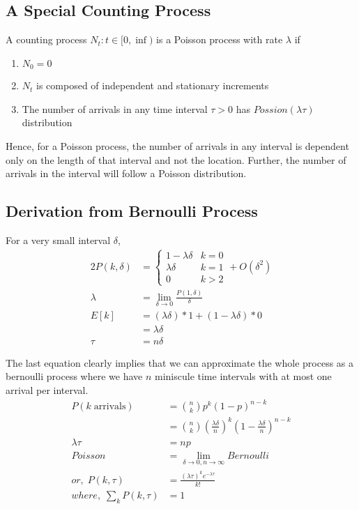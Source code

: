 \documentclass[../../probability-notes.tex]{subfiles}
\begin{document}
    \subsection{A Special Counting Process}
    A counting process $N_{t}:t \in [0,\inf)$ is a Poisson process with rate $\lambda$ if
    \begin{enumerate}
        \item $N_{0} = 0$
        \item $N_{t}$ is composed of independent and stationary increments
        \item The number of arrivals in any time interval $\tau > 0$ has $Possion(\lambda \tau)$ distribution
    \end{enumerate}
    Hence, for a Poisson process, the number of arrivals in any interval is dependent only on the length of that interval and not the location. Further, the number of arrivals in the interval will follow a Poisson distribution.

    \subsection{Derivation from Bernoulli Process}
    For a very small interval $\delta$,
    \begin{alignat*}{2}
        P(k, \delta) &= \begin{cases} 1-\lambda \delta &\mbox{$k = 0$}\\
                                     \lambda \delta &\mbox{$k = 1$}\\
                                     0 &\mbox{$k > 2$} \end{cases} + O(\delta^{2})\\
        \lambda &= \lim_{\delta \to 0}\frac{P(1,\delta)}{\delta} \tag*{arrival rate per unit time}\\
        E[k] &= (\lambda \delta) * 1 + (1-\lambda \delta) * 0\\
            &= \lambda \delta \\
        \tau &= n \delta
    \end{alignat*}

    The last equation clearly implies that we can approximate the whole process as a bernoulli process where we have $n$ miniscule time intervals with at most one arrival per interval.
    \begin{align*}
        P(k\; \text{arrivals}) &= \binom{n}{k} p^{k} (1-p)^{n-k} \\
            &= \binom{n}{k} (\frac{\lambda \delta}{n})^{k} (1 - \frac{\lambda \delta}{n})^{n-k}\\
        \lambda \tau &= np \tag*{or, arrival rate * time = E[arrivals]}\\
        Poisson &= \lim_{\delta \to 0, n \to \infty} Bernoulli\\
        or,\; P(k, \tau) &= \frac{(\lambda \tau)^{k} e^{-\lambda \tau}}{k!} \tag*{$k = 0,1, \cdots$, for a given $\tau$}\\
        where,\; \sum_{k} P(k, \tau) &= 1 \tag*{for a given $\tau$}
    \end{align*}
\end{document}
